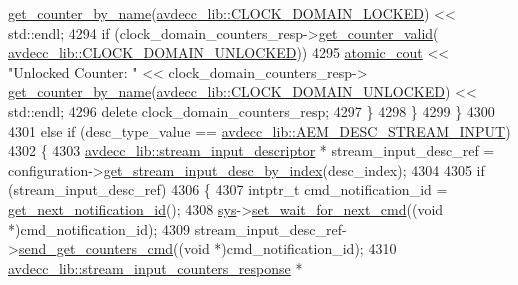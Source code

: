 \begin{DoxyCode}
      \hyperlink{classavdecc__lib_1_1clock__domain__counters__response_aad68050f63fc17c24527b3157d6ca8c7}{get\_counter\_by\_name}(\hyperlink{namespaceavdecc__lib_a831be56dba8ac423258a9374a1202df4a956e33777cd5b1499e9c1e3aba85afbd}{avdecc\_lib::CLOCK\_DOMAIN\_LOCKED}) << 
      std::endl;
4294                 \textcolor{keywordflow}{if} (clock\_domain\_counters\_resp->\hyperlink{classavdecc__lib_1_1clock__domain__counters__response_a1a714d004a3ca8b521311ba4d3e62e93}{get\_counter\_valid}(
      \hyperlink{namespaceavdecc__lib_a831be56dba8ac423258a9374a1202df4ab363d627741d74c605ed201dd91ce78e}{avdecc\_lib::CLOCK\_DOMAIN\_UNLOCKED}))
4295                     \hyperlink{cmd__line_8h_a0bc38ccc65c79ba06c6fcd7b4bf554c3}{atomic\_cout} << \textcolor{stringliteral}{"Unlocked Counter: "} << clock\_domain\_counters\_resp->
      \hyperlink{classavdecc__lib_1_1clock__domain__counters__response_aad68050f63fc17c24527b3157d6ca8c7}{get\_counter\_by\_name}(\hyperlink{namespaceavdecc__lib_a831be56dba8ac423258a9374a1202df4ab363d627741d74c605ed201dd91ce78e}{avdecc\_lib::CLOCK\_DOMAIN\_UNLOCKED}) 
      << std::endl;
4296                 \textcolor{keyword}{delete} clock\_domain\_counters\_resp;
4297             \}
4298         \}
4299     \}
4300 
4301     \textcolor{keywordflow}{else} \textcolor{keywordflow}{if} (desc\_type\_value == \hyperlink{namespaceavdecc__lib_ac7b7d227e46bc72b63ee9e9aae15902fa00d002e47651a1b007d50f9f2da51e53}{avdecc\_lib::AEM\_DESC\_STREAM\_INPUT})
4302     \{
4303         \hyperlink{classavdecc__lib_1_1stream__input__descriptor}{avdecc\_lib::stream\_input\_descriptor} * stream\_input\_desc\_ref = 
      configuration->\hyperlink{classavdecc__lib_1_1configuration__descriptor_a69cfe9032cea21937b4153878f8a925c}{get\_stream\_input\_desc\_by\_index}(desc\_index);
4304 
4305         \textcolor{keywordflow}{if} (stream\_input\_desc\_ref)
4306         \{
4307             intptr\_t cmd\_notification\_id = \hyperlink{classcmd__line_a57486218387d1aa9d262eb7c176154ad}{get\_next\_notification\_id}();
4308             \hyperlink{classcmd__line_a485db4800e331cb4052c447fdf5d154e}{sys}->\hyperlink{classavdecc__lib_1_1system_a26b769584f10225077da47583edda33e}{set\_wait\_for\_next\_cmd}((\textcolor{keywordtype}{void} *)cmd\_notification\_id);
4309             stream\_input\_desc\_ref->\hyperlink{classavdecc__lib_1_1stream__input__descriptor_ab657b0af297908406798934243812b7c}{send\_get\_counters\_cmd}((\textcolor{keywordtype}{void} *)cmd\_notification\_id);
4310             \hyperlink{classavdecc__lib_1_1stream__input__counters__response}{avdecc\_lib::stream\_input\_counters\_response} * 

\end{DoxyCode}
